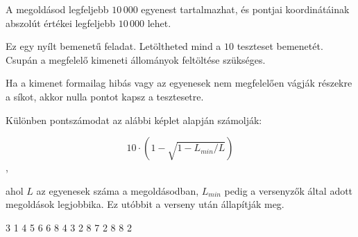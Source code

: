 A megoldásod legfeljebb $10\,000$ egyenest tartalmazhat, és pontjai koordinátáinak abszolút értékei legfeljebb $10\,000$ lehet.



Ez egy nyílt bemenetű feladat. Letöltheted mind a $10$ teszteset bemenetét. Csupán a megfelelő kimeneti állományok feltöltése szükséges.

Ha a kimenet formailag hibás vagy az egyenesek nem megfelelően vágják részekre a síkot, akkor nulla pontot kapsz a tesztesetre.

Különben pontszámodat az alábbi képlet alapján számolják:

$$ 10 \cdot \left(1 - \sqrt{1 - L_{min} / L}\right)$$,

ahol $L$ az egyenesek száma a megoldásodban, $L_{min}$ pedig a versenyzők által adott megoldások legjobbika. Ez utóbbit a verseny után állapítják meg.

\pagebreak


3 1
4 5
6 6
8 4
3 2 8 7
2 8 8 2
\sampleEND


